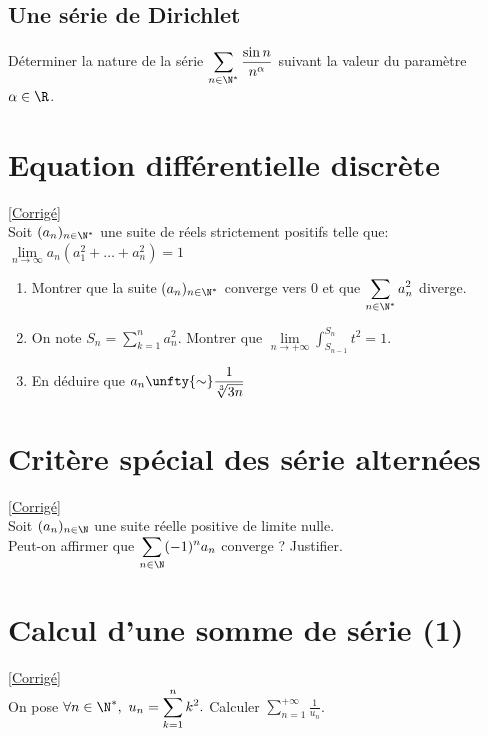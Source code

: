 \documentclass{book}
\begin{document}
	\subsection{Une série de Dirichlet }
	Déterminer la nature de la série $\displaystyle\sum_{n\in \N^*}\frac{\sin n}{n^\alpha}$ suivant la valeur du paramètre $\alpha\in \R$.
	
	\section{Equation différentielle discrète }
	\textcolor{blue}{\hyperref[sec:equation-differentielle-discreteetoile3]{[Corrigé]}}\\
	\label{Equation différentielle discrète}
	Soit $(a_n)_{n\in\N^*}$ une suite de réels strictement positifs telle que: $\lim\limits_{n\to\infty}a_n(a_1^2+\dots+a_n^2)=1$
	\begin{enumerate}[leftmargin=*]
		\item Montrer que la suite $(a_n)_{n\in \N^*}$ converge vers 0 et que $\displaystyle\sum\limits_{n\in\N^*}a_n^2$ diverge.
		\item On note $S_n=\displaystyle\sum\limits_{k=1}^na_n^2$. Montrer que $\displaystyle\lim\limits_{n\to+\infty}\int_{S_{n-1}}^{S_n}t^2=1$.
		\item En déduire que $a_n\unfty{\sim}\displaystyle\frac{1}{\sqrt[3]{3n}}$
	\end{enumerate}
	
	\section{Critère spécial des série alternées }
	\textcolor{blue}{\hyperref[sec:critere-special-des-series-alternees]{[Corrigé]}}\\
	\label{Critère spécial des séries alternées}
	Soit $(a_n)_{n\in \N}$ une suite réelle positive de limite nulle.\\
	Peut-on affirmer que $\displaystyle\sum\limits_{n\in \N}(-1)^na_n$ converge ? Justifier.
	
	\section{Calcul d'une somme de série (1) }
	\label{Calcul d'une somme de série (1)}
	\textcolor{blue}{\hyperref[Calcul d'une somme de série (1) corrigé]{[Corrigé]}}\\
	On pose $\forall n \in \N^*,\ u_n=\displaystyle\sum\limits_{k=1}^nk^2.$ Calculer  $\displaystyle\sum\limits_{n=1}^{+\infty}\frac{1}{u_n}$.
	
\end{document}

